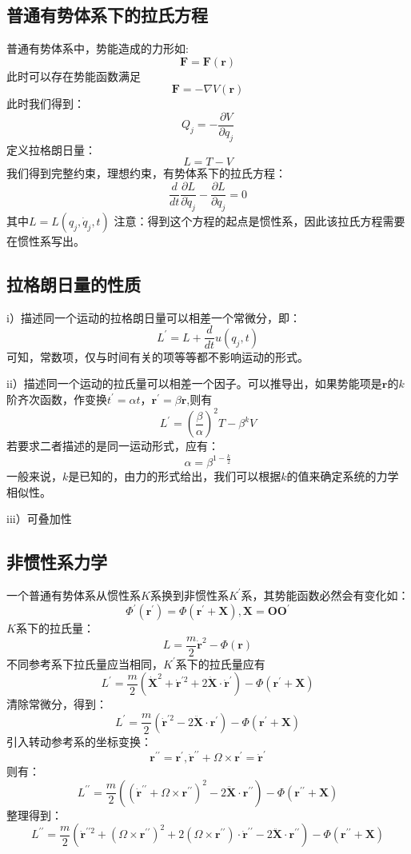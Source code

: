 \documentclass[a4paper, 10pt, openany]{book}%
\begin{document}
    \subsection{普通有势体系下的拉氏方程}
    普通有势体系中，势能造成的力形如:
    $$\textbf{F}=\textbf{F}(\textbf{r})$$
    此时可以存在势能函数满足
    $$\textbf{F}=-\nabla V(\textbf{r})$$
    此时我们得到：
    $$Q_j=-\frac{\partial V}{\partial q_j}$$
    定义拉格朗日量：
    $$L=T-V$$
    我们得到完整约束，理想约束，有势体系下的拉氏方程：
    \begin{equation}
      \frac{d}{dt}\frac{\partial L}{\partial \dot{q}_j}-\frac{\partial L}{\partial q_j}=0
    \end{equation}
    其中$L=L(q_j,\dot{q}_j,t)$
    注意：得到这个方程的起点是惯性系，因此该拉氏方程需要在惯性系写出。
    \subsection{拉格朗日量的性质}
    i）描述同一个运动的拉格朗日量可以相差一个常微分，即：
    \begin{equation}
      L^{\prime}=L+\frac{d}{dt}u(q_j,t)
    \end{equation}
    可知，常数项，仅与时间有关的项等等都不影响运动的形式。

    ii）描述同一个运动的拉氏量可以相差一个因子。可以推导出，如果势能项是$\textbf{r}$的$k$阶齐次函数，作变换$t^\prime=\alpha t，\textbf{r}^\prime=\beta\textbf{r}$,则有
    $$L^\prime=(\frac{\beta}{\alpha})^2T-\beta^kV$$
    若要求二者描述的是同一运动形式，应有：
    $$\alpha=\beta^{1-\frac{k}{2}}$$
    一般来说，$k$是已知的，由力的形式给出，我们可以根据$k$的值来确定系统的力学相似性。
    
    iii）可叠加性
    \subsection{非惯性系力学}
    一个普通有势体系从惯性系$K$系换到非惯性系$K^{\prime}$系，其势能函数必然会有变化如：
    $$\Phi^{\prime}(\textbf{r}^\prime)=\Phi(\textbf{r}^\prime+\textbf{X}),\textbf{X}=\textbf{OO}^\prime$$
    $K$系下的拉氏量：
    $$L=\frac{m}{2}\dot{\textbf{r}}^2-\Phi (\textbf{r})$$
    不同参考系下拉氏量应当相同，$K^\prime$系下的拉氏量应有
    $$L^\prime=\frac{m}{2}(\dot{\textbf{X}}^{2}+\dot{\textbf{r}}^{\prime 2}+2\dot{\textbf{X}}\cdot\dot{\textbf{r}}^\prime)-\Phi(\textbf{r}^\prime+\textbf{X})$$
    清除常微分，得到：
    $$L^\prime=\frac{m}{2}(\dot{\textbf{r}}^{\prime 2}-2\ddot{{\textbf{X}}}\cdot{\textbf{r}^\prime})-\Phi(\textbf{r}^\prime+\textbf{X})$$
    引入转动参考系的坐标变换：
    $$\textbf{r}^{\prime \prime}=\textbf{r}^{\prime},\dot{\textbf{r}}^{\prime \prime}+\Omega\times \textbf{r}^\prime=\dot{\textbf{r}}^{\prime} $$
    则有：
    $$L^{\prime\prime}=\frac{m}{2}((\dot{\textbf{r}}^{\prime \prime}+\Omega\times \textbf{r}^{\prime\prime})^2-2\ddot{\textbf{X}}\cdot \textbf{r}^{\prime \prime})-\Phi(\textbf{r}^{\prime\prime}+\textbf{X})$$
    整理得到：
    $$L^{\prime\prime}=\frac{m}{2}(\dot{\textbf{r}}^{\prime \prime2}+(\Omega\times \textbf{r}^{\prime \prime})^2+2(\Omega\times\textbf{r}^{\prime\prime})\cdot\dot{\textbf{r}}^{\prime\prime}-2\ddot{\textbf{X}}\cdot \textbf{r}^{\prime \prime})-\Phi(\textbf{r}^{\prime\prime}+\textbf{X})$$
\end{document}
